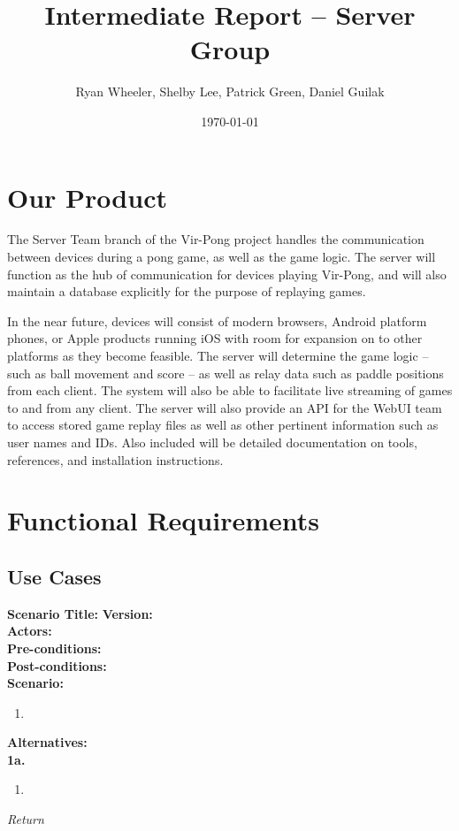 \documentclass[letterpaper,12pt]{article}
\begin{document}
\title{Intermediate Report -- Server Group}
\author{Ryan Wheeler, Shelby Lee, Patrick Green, Daniel Guilak}
\date{\today}
\maketitle
\newpage

\tableofcontents
\newpage

\section{Our Product}
The Server Team branch of the Vir-Pong project handles the communication between devices during a pong game, as well as the game logic. The server will function as the hub of communication for devices playing Vir-Pong, and will also maintain a database explicitly for the purpose of replaying games.

In the near future, devices will consist of modern browsers, Android platform phones, or Apple products running iOS with room for expansion on to other platforms as they become feasible. The server will determine the game logic -- such as ball movement and score -- as well as relay data such as paddle positions from each client. The system will also be able to facilitate live streaming of games to and from any client. The server will also provide an API for the WebUI team to access stored game replay files as well as other pertinent information such as user names and IDs. Also included will be detailed documentation on tools, references, and installation instructions.

\section{Functional Requirements}

\subsection{Use Cases}

\noindent \textbf{Scenario Title:}
\textbf{Version:} \\
\textbf{Actors:} \\
\textbf{Pre-conditions:}\\
\textbf{Post-conditions:}\\
\textbf{Scenario:}\\
\begin{enumerate}
\item
\end{enumerate}
\textbf{Alternatives:}\\
\textbf{1a.} 
\begin{enumerate}
\item
\end{enumerate}
\emph{Return}\\
\end{document}
